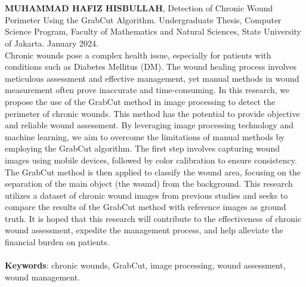 \chapter*{}
\singlespacing{}

\textbf{MUHAMMAD HAFIZ HISBULLAH}, Detection of Chronic Wound Perimeter Using the 
GrabCut Algorithm. Undergraduate Thesis, Computer Science Program, Faculty of 
Mathematics and Natural Sciences, State University of Jakarta. January 2024.
\\

Chronic wounds pose a complex health issue, especially for patients with conditions 
such as Diabetes Mellitus (DM). The wound healing process involves meticulous 
assessment and effective management, yet manual methods in wound measurement often 
prove inaccurate and time-consuming. In this research, we propose the use of the 
GrabCut method in image processing to detect the perimeter of chronic wounds. 
This method has the potential to provide objective and reliable wound assessment.
By leveraging image processing technology and machine learning, we aim to overcome 
the limitations of manual methods by employing the GrabCut algorithm. The first 
step involves capturing wound images using mobile devices, followed by color 
calibration to ensure consistency. The GrabCut method is then applied to classify 
the wound area, focusing on the separation of the main object (the wound) from 
the background. This research utilizes a dataset of chronic wound images from 
previous studies and seeks to compare the results of the GrabCut method with 
reference images as ground truth. It is hoped that this research will contribute 
to the effectiveness of chronic wound assessment, expedite the management process, 
and help alleviate the financial burden on patients.
\\
\\
\textbf{Keywords}: chronic wounds, GrabCut, image processing, wound assessment, wound management.